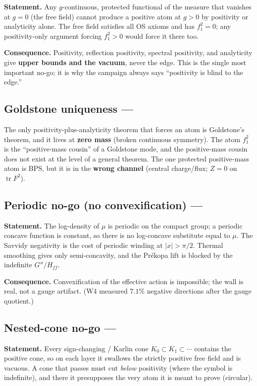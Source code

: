 \textbf{Statement.} Any $g$-continuous, protected functional of the measure that vanishes at
$g=0$ (the free field) cannot produce a positive atom at $g>0$ by positivity or analyticity
alone. The free field satisfies all OS axioms and has $f_1^2=0$; any positivity-only argument
forcing $f_1^2>0$ would force it there too.

\textbf{Consequence.} Positivity, reflection positivity, spectral positivity, and analyticity
give \textbf{upper bounds and the vacuum}, never the edge. This is the single most important
no-go; it is why the campaign always says ``positivity is blind to the edge.''

\subsection{Goldstone uniqueness --- \LN}

The only positivity-plus-analyticity theorem that forces an atom is Goldstone's theorem, and it
lives at \textbf{zero mass} (broken continuous symmetry). The atom $f_1^2$ is the ``positive-mass
cousin'' of a Goldstone mode, and the positive-mass cousin does not exist at the level of a
general theorem. The one protected positive-mass atom is BPS, but it is in the \textbf{wrong
channel} (central charge/flux; $Z=0$ on $\operatorname{tr}F^2$).

\subsection{Periodic no-go (no convexification) --- \LN}

\textbf{Statement.} The log-density of $\mu$ is periodic on the compact group; a periodic concave
function is constant, so there is no log-concave substitute equal to $\mu$. The Savvidy negativity
is the cost of periodic winding at $|x|>\pi/2$. Thermal smoothing gives only semi-concavity, and
the Prékopa lift is blocked by the indefinite $G''/H_{ff}$.

\textbf{Consequence.} Convexification of the effective action is impossible; the wall is real,
not a gauge artifact. (W4 measured $7.1\%$ negative directions after the gauge quotient.)

\subsection{Nested-cone no-go --- \LN}

\textbf{Statement.} Every sign-changing / Karlin cone $K_0\subset K_1\subset\cdots$ contains the
positive cone, so on each layer it swallows the strictly positive free field and is vacuous. A
cone that passes must cut \emph{below} positivity (where the symbol is indefinite), and there it
presupposes the very atom it is meant to prove (circular).

